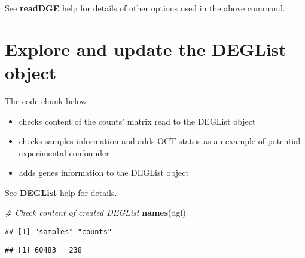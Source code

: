 \documentclass[]{book}
\newenvironment{Shaded}{\begin{snugshade}}{\end{snugshade}}
\newcommand{\KeywordTok}[1]{\textcolor[rgb]{0.13,0.29,0.53}{\textbf{#1}}}
\newcommand{\DecValTok}[1]{\textcolor[rgb]{0.00,0.00,0.81}{#1}}
\newcommand{\CommentTok}[1]{\textcolor[rgb]{0.56,0.35,0.01}{\textit{#1}}}
\newcommand{\OperatorTok}[1]{\textcolor[rgb]{0.81,0.36,0.00}{\textbf{#1}}}
\newcommand{\NormalTok}[1]{#1}
\providecommand{\tightlist}{%
  \setlength{\itemsep}{0pt}\setlength{\parskip}{0pt}}
\begin{document}
See \textbf{readDGE} help for details of other options used in the above
command.

\section{Explore and update the DEGList
object}\label{explore-and-update-the-deglist-object}

The code chunk below

\begin{itemize}
\tightlist
\item
  checks content of the counts' matrix read to the DEGList object\\
\item
  checks samples information and adds OCT-status as an example of
  potential experimental confounder\\
\item
  adds genes information to the DEGList object
\end{itemize}

See \textbf{DEGList} help for details.

\begin{Shaded}
\begin{Highlighting}[]
\CommentTok{# Check content of created DEGList}
\KeywordTok{names}\NormalTok{(dgl)}
\end{Highlighting}
\end{Shaded}

\begin{verbatim}
## [1] "samples" "counts"
\end{verbatim}

\begin{Shaded}
\end{Shaded}

\begin{verbatim}
## [1] 60483   238
\end{verbatim}

\begin{Shaded}
\end{Shaded}
\end{document}
